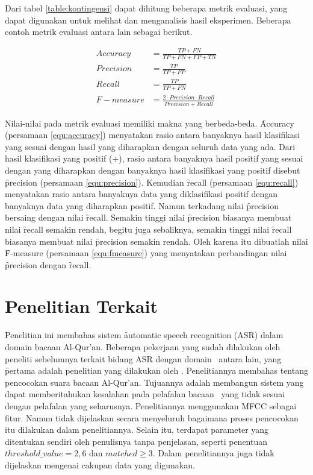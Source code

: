Dari tabel \ref{table:kontingensi} dapat dihitung beberapa metrik evaluasi, yang dapat digunakan untuk melihat dan menganalisis hasil eksperimen. Beberapa contoh metrik evaluasi antara lain sebagai berikut.

\begin{align}
  Accuracy &= \frac{TP+FN}{TP+FN+FP+TN} \label{equ:accuracy} \\
  Precision &= \frac{TP}{TP+FP} \label{equ:precision} \\
  Recall &= \frac{TP}{TP+FN} \label{equ:recall} \\
  F-measure &= \frac{2 \cdot Precision \cdot Recall}{Precision + Recall} \label{equ:fmeasure}
\end{align}

Nilai-nilai pada metrik evaluasi memiliki makna yang berbeda-beda. \f{Accuracy} (persamaan \ref{equ:accuracy}) menyatakan rasio antara banyaknya hasil klasifikasi yang sesuai dengan hasil yang diharapkan dengan seluruh data yang ada. Dari hasil klasifikasi yang positif (+), rasio antara banyaknya hasil positif yang sesuai dengan yang diharapkan dengan banyaknya hasil klasifikasi yang positif disebut \f{precision} (persamaan \ref{equ:precision}). Kemudian \f{recall} (persamaan \ref{equ:recall}) menyatakan rasio antara banyaknya data yang diklasifikasi positif dengan banyaknya data yang diharapkan positif. Namun terkadang nilai \f{precision} bersaing dengan nilai \f{recall}. Semakin tinggi nilai \f{precision} biasanya membuat nilai \f{recall} semakin rendah, begitu juga sebaliknya, semakin tinggi nilai \f{recall} biasanya membuat nilai \f{precision} semakin rendah. Oleh karena itu dibuatlah nilai \f{F-measure} (persamaan \ref{equ:fmeasure}) yang menyatakan perbandingan nilai \f{precision} dengan \f{recall}.



\section{Penelitian Terkait}
Penelitian ini membahas sistem \f{automatic speech recognition} (ASR) dalam domain bacaan Al-Qur'an. Beberapa pekerjaan yang sudah dilakukan oleh peneliti sebelumnya terkait bidang ASR dengan domain \quran~antara lain, yang \f{pertama} adalah penelitian yang dilakukan oleh \cite{Muhammad:2010:VCM:1934908.1935467}. Penelitiannya membahas tentang pencocokan suara bacaan Al-Qur'an. Tujuannya adalah membangun sistem yang dapat memberitahukan kesalahan pada pelafalan bacaan \quran~yang tidak sesuai dengan pelafalan yang seharusnya. Penelitiannya menggunakan MFCC sebagai fitur. Namun tidak dijelaskan secara menyeluruh bagaimana proses pencocokan itu dilakukan dalam penelitiannya. Selain itu, terdapat parameter yang ditentukan sendiri oleh penulisnya tanpa penjelasan, seperti penentuan $threshold\_value = 2,6$ dan $matched \geq 3$. Dalam penelitiannya juga tidak dijelaskan mengenai cakupan data yang digunakan.

